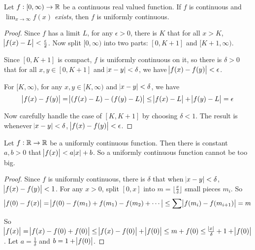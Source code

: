 \begin{theorem}
    Let $f: [0, \infty) \rightarrow \mathbb{R}$ be a continuous real valued function. If $f$ is continuous and \emph{$\displaystyle \lim_{x\rightarrow \infty} f(x)$ exists}, then $f$ is uniformly continuous.
\end{theorem}
\begin{proof}
    Since $f$ has a limit $L$, for any $\epsilon > 0$, there is $K$ that for all $x > K$, $\abs{f(x) - L} < \frac{\epsilon}{2}$. Now split $[0, \infty)$ into two parts: $[0, K+1]$ and $[K+1, \infty)$.
    
    Since $[0, K+1]$ is compact, $f$ is uniformly continuous on it, so there is $\delta>0$ that for all $x,y \in [0,K+1]$ and $\abs{x-y} < \delta$, we have $\abs{f(x) - f(y)} < \epsilon$.
    
    For $[K, \infty)$, for any $x,y \in [K, \infty)$ and $\abs{x - y} < \delta$, we have
    \begin{equation*}
        \abs{f(x) - f(y)} = \abs{(f(x) - L) - (f(y) - L)} \leq \abs{f(x) - L} + \abs{f(y) - L} = \epsilon
    \end{equation*}
    
    Now carefully handle the case of $[K, K+1]$ by choosing $\delta < 1$. The result is whenever $\abs{x - y } < \delta$, $\abs{f(x) - f(y)} < \epsilon$.
\end{proof}

\begin{theorem}\label{uniform_on_r_with_linear_function}
    Let $f:\mathbb{R} \rightarrow \mathbb{R}$ be a uniformly continuous function. Then there is constant $a,b >0$ that $\abs{f(x)} < a \abs{x} + b$. So a uniformly continuous function cannot be too big.
\end{theorem}
\begin{proof}
    Since $f$ is uniformly continuous, there is $\delta$ that when $\abs{x-y} < \delta$, $\abs{f(x) - f(y)} < 1$. For any $x > 0$, split $[0,x]$ into $m = \lfloor \frac{x}{\delta} \rfloor$ small pieces $m_i$. So
    \begin{equation*}
        \abs{f(0) - f(x)} = \abs{f(0) - f(m_1) + f(m_1) - f(m_2) + \cdots} \leq \sum \abs{f(m_i) - f(m_{i+1})} = m
    \end{equation*}
    
    So $\abs{f(x)} = \abs{f(x) - f(0) + f(0)} \leq \abs{f(x) - f(0)} + \abs{f(0)} \leq m + f(0) \leq \frac{\abs{x}}{\delta} + 1 + \abs{f(0)}$. Let $a = \frac{1}{\delta}$ and $b = 1 + \abs{f(0)}$.
\end{proof}

